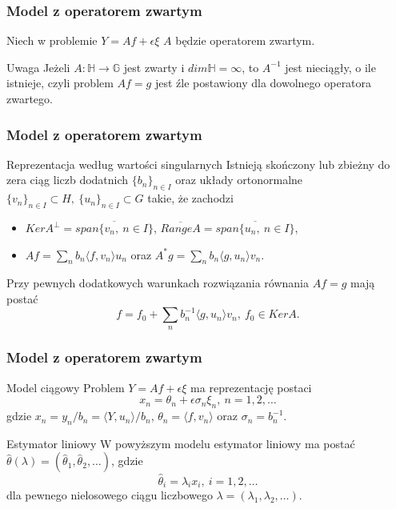 \documentclass{beamer}
\begin{document}
\begin{frame}\frametitle{Model z operatorem zwartym}
\begin{center}
Niech w problemie $Y=Af+\epsilon\xi$ $A$ będzie operatorem zwartym.
\end{center}
\begin{block}{Uwaga}
Jeżeli $A\colon \mathbb{H}\to \mathbb{G}$ jest zwarty i $dim \mathbb{H} = \infty$, to $A^{-1}$ jest nieciągły, o ile istnieje, czyli problem $Af = g$ jest źle postawiony dla dowolnego operatora zwartego.
\end{block}
\end{frame}

\begin{frame}\frametitle{Model z operatorem zwartym}
\begin{block}{Reprezentacja według wartości singularnych}
Istnieją skończony lub zbieżny do zera ciąg liczb dodatnich $\{b_n\}_{n\in I}$ oraz układy ortonormalne $\{v_n\}_{n\in I}\subset H,\ \{u_n\}_{n\in I}\subset G$ takie, że zachodzi
\begin{itemize}
\item $KerA^{\perp}=\overline{span\{v_n,\ n\in I\}}$, $\overline{RangeA}=\overline{span\{u_n,\ n\in I\}}$,
\item $Af=\sum_nb_n\langle f, v_n\rangle u_n$ oraz $A^*g=\sum_nb_n\langle g, u_n\rangle v_n$.
\end{itemize}
Przy pewnych dodatkowych warunkach rozwiązania równania $Af=g$ mają postać 
\begin{displaymath}
f=f_0+\sum_nb_n^{-1}\langle g, u_n\rangle v_n,\ f_0\in KerA.
\end{displaymath}
\end{block}
\end{frame}

\begin{frame}\frametitle{Model z operatorem zwartym}
\begin{block}{Model ciągowy}
Problem $Y = Af +\epsilon\xi$ ma reprezentację postaci
\begin{displaymath}
x_n=\theta_n+\epsilon\sigma_n\xi_n,\ n=1,2,\dots
\end{displaymath}
gdzie $x_n=y_n/b_n = \langle Y, u_n\rangle /b_n$, $\theta_n = \langle f, v_n\rangle$ oraz $\sigma_n=b_n^{-1}$.
\end{block}
\begin{block}{Estymator liniowy}
W powyższym modelu estymator liniowy ma postać $\hat{\theta}(\lambda)=(\hat{\theta}_1,\hat{\theta}_2,\dots)$, gdzie
\begin{displaymath}
\hat{\theta}_i=\lambda_ix_i,\ i=1,2,\dots
\end{displaymath}
dla pewnego nielosowego ciągu liczbowego $\lambda=(\lambda_1,\lambda_2,\dots)$.
\end{block}
\end{frame}
\end{document}
